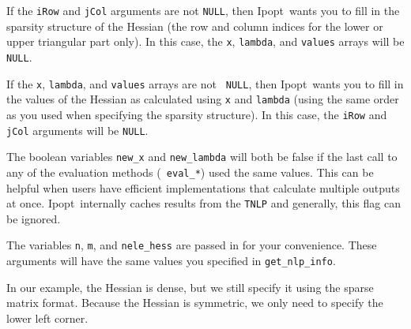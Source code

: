 \documentclass[10pt]{article}
\newcommand{\Ipopt}{{\sc Ipopt}}
\begin{document}
If the {\tt iRow} and {\tt jCol} arguments are not {\tt NULL}, then
\Ipopt\ wants you to fill in the sparsity structure of the Hessian
(the row and column indices for the lower or upper triangular part
only). In this case, the {\tt x}, {\tt lambda}, and {\tt values}
arrays will be {\tt NULL}.

If the {\tt x}, {\tt lambda}, and {\tt values} arrays are not {\tt
  NULL}, then \Ipopt\ wants you to fill in the values of the Hessian
as calculated using {\tt x} and {\tt lambda} (using the same order as
you used when specifying the sparsity structure). In this case, the
{\tt iRow} and {\tt jCol} arguments will be {\tt NULL}.

The boolean variables {\tt new\_x} and {\tt new\_lambda} will both be
false if the last call to any of the evaluation methods ({\tt
  eval\_*}) used the same values. This can be helpful when users have
efficient implementations that calculate multiple outputs at once.
\Ipopt\ internally caches results from the {\tt TNLP} and generally,
this flag can be ignored.

The variables {\tt n}, {\tt m}, and {\tt nele\_hess} are passed in for
your convenience. These arguments will have the same values you
specified in {\tt get\_nlp\_info}.

In our example, the Hessian is dense, but we still specify it using the
sparse matrix format. Because the Hessian is symmetric, we only need to 
specify the lower left corner.
\end{document}
